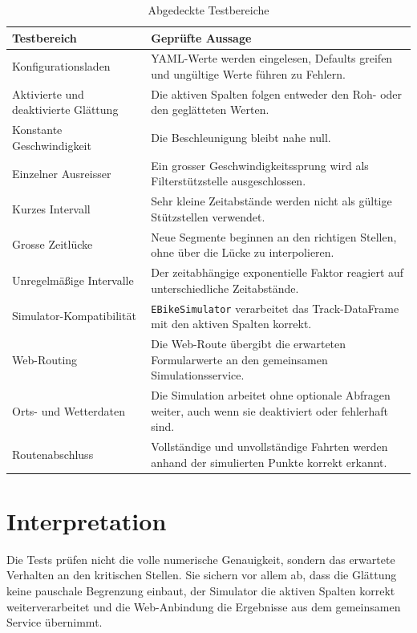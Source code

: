 \begin{table}[htbp]
\centering
\caption{Abgedeckte Testbereiche}
\label{tab:testbereiche}
\begin{tabularx}{\textwidth}{@{}lX@{}}
\toprule
Testbereich & Geprüfte Aussage \\
\midrule
Konfigurationsladen & YAML-Werte werden eingelesen, Defaults greifen und ungültige Werte führen zu Fehlern. \\
Aktivierte und deaktivierte Glättung & Die aktiven Spalten folgen entweder den Roh- oder den geglätteten Werten. \\
Konstante Geschwindigkeit & Die Beschleunigung bleibt nahe null. \\
Einzelner Ausreisser & Ein grosser Geschwindigkeitssprung wird als Filterstützstelle ausgeschlossen. \\
Kurzes Intervall & Sehr kleine Zeitabstände werden nicht als gültige Stützstellen verwendet. \\
Grosse Zeitlücke & Neue Segmente beginnen an den richtigen Stellen, ohne über die Lücke zu interpolieren. \\
Unregelmäßige Intervalle & Der zeitabhängige exponentielle Faktor reagiert auf unterschiedliche Zeitabstände. \\
Simulator-Kompatibilität & \texttt{EBikeSimulator} verarbeitet das Track-DataFrame mit den aktiven Spalten korrekt. \\
Web-Routing & Die Web-Route übergibt die erwarteten Formularwerte an den gemeinsamen Simulationsservice. \\
Orts- und Wetterdaten & Die Simulation arbeitet ohne optionale Abfragen weiter, auch wenn sie deaktiviert oder fehlerhaft sind. \\
Routenabschluss & Vollständige und unvollständige Fahrten werden anhand der simulierten Punkte korrekt erkannt. \\
\bottomrule
\end{tabularx}
\end{table}

\section{Interpretation}

Die Tests prüfen nicht die volle numerische Genauigkeit, sondern das erwartete Verhalten an den kritischen Stellen. Sie sichern vor allem ab, dass die Glättung keine pauschale Begrenzung einbaut, der Simulator die aktiven Spalten korrekt weiterverarbeitet und die Web-Anbindung die Ergebnisse aus dem gemeinsamen Service übernimmt.